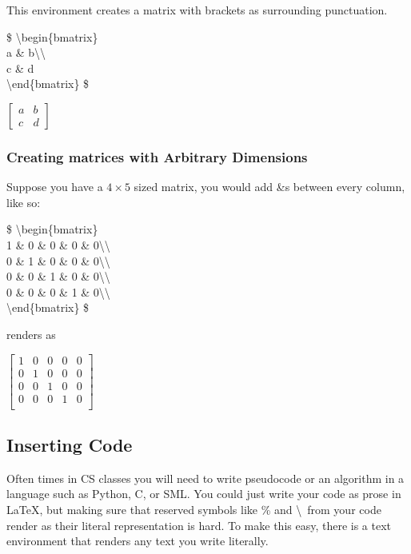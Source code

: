 \documentclass[11pt,onecolumn]{article}
\theoremstyle{definition}
\begin{document}
\begin{enumerate}
    This environment creates a matrix with brackets as surrounding punctuation.
    
    \begin{tcolorbox}
    \$
    \textbackslash begin\{bmatrix\}\\
        a \& b\textbackslash\textbackslash\\
        c \& d\\
    \textbackslash end\{bmatrix\}
    \$
    \end{tcolorbox}
    
    $\begin{bmatrix}
        a & b\\
        c & d
    \end{bmatrix}$
\end{enumerate}

\subsubsection{Creating matrices with Arbitrary Dimensions}

Suppose you have a $4\times 5$ sized matrix, you would add \&s between every column, like so:

\begin{tcolorbox}
\$
\textbackslash begin\{bmatrix\}\\
    1 \& 0 \& 0 \& 0 \& 0\textbackslash\textbackslash\\
    0 \& 1 \& 0 \& 0 \& 0\textbackslash\textbackslash\\
    0 \& 0 \& 1 \& 0 \& 0\textbackslash\textbackslash\\
    0 \& 0 \& 0 \& 1 \& 0\textbackslash\textbackslash\\
\textbackslash end\{bmatrix\}
\$
\end{tcolorbox}

renders as

$
\begin{bmatrix}
1 & 0 & 0 & 0 & 0\\
0 & 1 & 0 & 0 & 0\\
0 & 0 & 1 & 0 & 0\\
0 & 0 & 0 & 1 & 0\\
\end{bmatrix}
$

\subsection{Inserting Code}

Often times in CS classes you will need to write pseudocode or an algorithm in a language such as Python, C, or SML. You could just write your code as prose in \LaTeX, but making sure that reserved symbols like \% and \textbackslash\ from your code render as their literal representation is hard. To make this easy, there is a text environment that renders any text you write literally.
\end{document}

